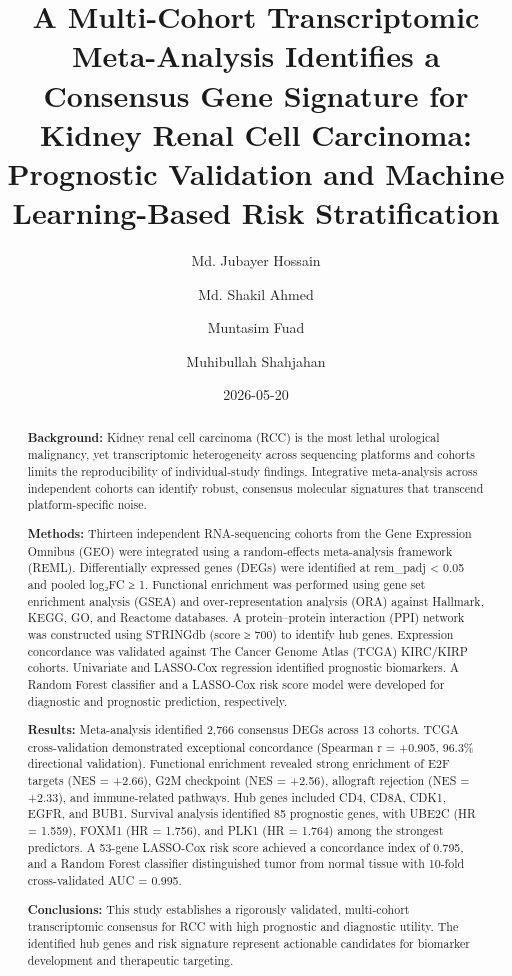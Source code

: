 \documentclass[
  12pt,
]{article}
\title{A Multi-Cohort Transcriptomic Meta-Analysis Identifies a
Consensus Gene Signature for Kidney Renal Cell Carcinoma: Prognostic
Validation and Machine Learning-Based Risk Stratification}
\author{Md. Jubayer Hossain \and Md. Shakil Ahmed \and Muntasim
Fuad \and Muhibullah Shahjahan}
\date{2026-05-20}
\begin{document}
\maketitle
\begin{abstract}
\textbf{Background:} Kidney renal cell carcinoma (RCC) is the most
lethal urological malignancy, yet transcriptomic heterogeneity across
sequencing platforms and cohorts limits the reproducibility of
individual-study findings. Integrative meta-analysis across independent
cohorts can identify robust, consensus molecular signatures that
transcend platform-specific noise.

\textbf{Methods:} Thirteen independent RNA-sequencing cohorts from the
Gene Expression Omnibus (GEO) were integrated using a random-effects
meta-analysis framework (REML). Differentially expressed genes (DEGs)
were identified at rem\_padj \textless{} 0.05 and \textbar pooled
log₂FC\textbar{} ≥ 1. Functional enrichment was performed using gene set
enrichment analysis (GSEA) and over-representation analysis (ORA)
against Hallmark, KEGG, GO, and Reactome databases. A protein--protein
interaction (PPI) network was constructed using STRINGdb (score ≥ 700)
to identify hub genes. Expression concordance was validated against The
Cancer Genome Atlas (TCGA) KIRC/KIRP cohorts. Univariate and LASSO-Cox
regression identified prognostic biomarkers. A Random Forest classifier
and a LASSO-Cox risk score model were developed for diagnostic and
prognostic prediction, respectively.

\textbf{Results:} Meta-analysis identified 2,766 consensus DEGs across
13 cohorts. TCGA cross-validation demonstrated exceptional concordance
(Spearman r = +0.905, 96.3\% directional validation). Functional
enrichment revealed strong enrichment of E2F targets (NES = +2.66), G2M
checkpoint (NES = +2.56), allograft rejection (NES = +2.33), and
immune-related pathways. Hub genes included CD4, CD8A, CDK1, EGFR, and
BUB1. Survival analysis identified 85 prognostic genes, with UBE2C (HR =
1.559), FOXM1 (HR = 1.756), and PLK1 (HR = 1.764) among the strongest
predictors. A 53-gene LASSO-Cox risk score achieved a concordance index
of 0.795, and a Random Forest classifier distinguished tumor from normal
tissue with 10-fold cross-validated AUC = 0.995.

\textbf{Conclusions:} This study establishes a rigorously validated,
multi-cohort transcriptomic consensus for RCC with high prognostic and
diagnostic utility. The identified hub genes and risk signature
represent actionable candidates for biomarker development and
therapeutic targeting.
\end{abstract}
\end{document}
